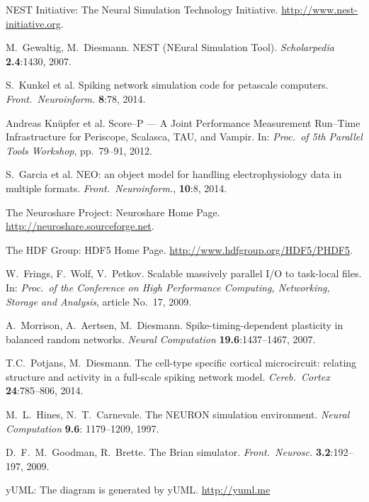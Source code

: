 \documentclass[]{YIC2015}
\begin{document}
\begin{thebibliography}{99}

 NEST Initiative: The Neural Simulation
  Technology Initiative. \url{http://www.nest-initiative.org}.

  M.~Gewaltig, M.~Diesmann. NEST (NEural Simulation
  Tool). \textit{Scholarpedia} %
  \textbf{2.4}:1430, 2007.

 S.~Kunkel et al. Spiking network simulation code for
  petascale computers.  \textit{Front.~Neuroinform.} \textbf{8}:78,
  2014.

 Andreas Kn\"upfer et al. Score--P --- A Joint
  Performance Measurement Run--Time Infrastructure for Periscope,
  Scalasca, TAU, and Vampir. In: \textit{Proc.~of 5th Parallel Tools
    Workshop}, pp.~79--91, 2012.

 S.~Garcia et al. NEO: an object model for handling
  electrophysiology data in multiple formats.
  \textit{Front.~Neuroinform.}, \textbf{10}:8, 2014.

 The Neuroshare Project: Neuroshare Home
  Page. \url{http://neuroshare.sourceforge.net}.

 The HDF Group: HDF5 Home
  Page. \url{http://www.hdfgroup.org/HDF5/PHDF5}.

 W.~Frings, F.~Wolf, V.~Petkov. Scalable
  massively parallel I/O to task-local files.  In: \textit{Proc.~of
  the Conference on High Performance Computing, Networking,
    Storage and Analysis}, article No.~17, 2009.

 A.~Morrison, A.~Aertsen,
  M.~Diesmann. Spike-timing-dependent plasticity in balanced random
  networks. \textit{Neural Computation} \textbf{19.6}:1437--1467,
  2007.

 T.C.~Potjans, M.~Diesmann. The cell-type specific
  cortical microcircuit: relating structure and activity in a
  full-scale spiking network model. \textit{Cereb.~Cortex}
  \textbf{24}:785--806, 2014.

 M.~L.~Hines, N.~T.~Carnevale. The NEURON simulation
  environment. \textit{Neural Computation} \textbf{9.6}: 1179--1209,
  1997.

 D.~F.~M.~Goodman, R.~Brette. The Brian
  simulator. \textit{Front.~Neurosc.} \textbf{3.2}:192--197, 2009.
  
 yUML: The diagram is generated by yUML. \url{http://yuml.me}

\end{thebibliography}
\end{document}

